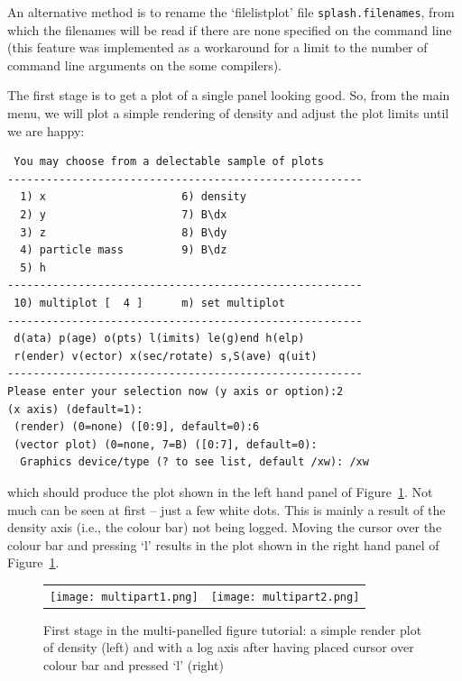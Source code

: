 \documentclass[a4paper,10pt]{article}
\begin{document}
An alternative method is to rename the `filelistplot' file \verb+splash.filenames+, from which the filenames will be read if there are none specified on the command line (this feature was implemented as a workaround for a limit to the number of command line arguments on the some compilers).

 The first stage is to get a plot of a single panel looking good. So, from the main menu, we will plot a simple rendering of density and adjust the plot limits until we are happy:
\begin{verbatim}
 You may choose from a delectable sample of plots 
-------------------------------------------------------
  1) x                     6) density             
  2) y                     7) B\dx                
  3) z                     8) B\dy                
  4) particle mass         9) B\dz                
  5) h                   
-------------------------------------------------------
 10) multiplot [  4 ]      m) set multiplot 
-------------------------------------------------------
 d(ata) p(age) o(pts) l(imits) le(g)end h(elp)
 r(ender) v(ector) x(sec/rotate) s,S(ave) q(uit)
-------------------------------------------------------
Please enter your selection now (y axis or option):2
(x axis) (default=1):
 (render) (0=none) ([0:9], default=0):6
 (vector plot) (0=none, 7=B) ([0:7], default=0):
  Graphics device/type (? to see list, default /xw): /xw
\end{verbatim}
which should produce the plot shown in the left hand panel of Figure~\ref{fig:multipart1}. Not much can be seen at first -- just a few white dots. This is mainly a result of the density axis (i.e., the colour bar) not being logged. Moving the cursor over the colour bar and pressing `l' results in the plot shown in the right hand panel of Figure~\ref{fig:multipart1}.
\begin{figure}[h]
\begin{center}
\begin{tabular}{cc}
\texttt{[image: multipart1.png]} &
\texttt{[image: multipart2.png]}
\end{tabular}
\caption{First stage in the multi-panelled figure tutorial: a simple render plot of density (left) and with a log axis after having placed cursor over colour bar and pressed `l' (right)}
\label{fig:multipart1}
\end{center}
\end{figure}
\end{document}
